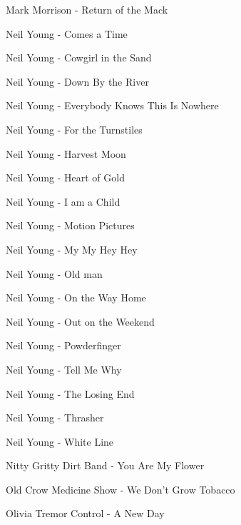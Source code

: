 Mark Morrison - Return of the Mack \dotfill \pageref{Return of the Mack - Mark Morrison} 

Neil Young - Comes a Time \dotfill \pageref{Comes a Time - Neil Young} 

Neil Young - Cowgirl in the Sand \dotfill \pageref{Cowgirl in the Sand - Neil Young} 

Neil Young - Down By the River \dotfill \pageref{Down By the River - Neil Young} 

Neil Young - Everybody Knows This Is Nowhere \dotfill \pageref{Everybody Knows This Is Nowhere - Neil Young} 

Neil Young - For the Turnstiles \dotfill \pageref{For the Turnstiles - Neil Young} 

Neil Young - Harvest Moon \dotfill \pageref{Harvest Moon - Neil Young} 

Neil Young - Heart of Gold \dotfill \pageref{Heart of Gold - Neil Young} 

Neil Young - I am a Child \dotfill \pageref{I am a Child - Neil Young} 

Neil Young - Motion Pictures \dotfill \pageref{Motion Pictures - Neil Young} 

Neil Young - My My Hey Hey \dotfill \pageref{My My Hey Hey - Neil Young} 

Neil Young - Old man \dotfill \pageref{Old man - Neil Young} 

Neil Young - On the Way Home \dotfill \pageref{On the Way Home - Neil Young} 

Neil Young - Out on the Weekend \dotfill \pageref{Out on the Weekend - Neil Young} 

Neil Young - Powderfinger \dotfill \pageref{Powderfinger - Neil Young} 

Neil Young - Tell Me Why \dotfill \pageref{Tell Me Why - Neil Young} 

Neil Young - The Losing End \dotfill \pageref{The Losing End - Neil Young} 

Neil Young - Thrasher \dotfill \pageref{Thrasher - Neil Young} 

Neil Young - White Line \dotfill \pageref{White Line - Neil Young} 

Nitty Gritty Dirt Band - You Are My Flower \dotfill \pageref{You Are My Flower - Nitty Gritty Dirt Band} 

Old Crow Medicine Show - We Don't Grow Tobacco \dotfill \pageref{We Don't Grow Tobacco - Old Crow Medicine Show} 

Olivia Tremor Control - A New Day \dotfill \pageref{A New Day - Olivia Tremor Control} 

